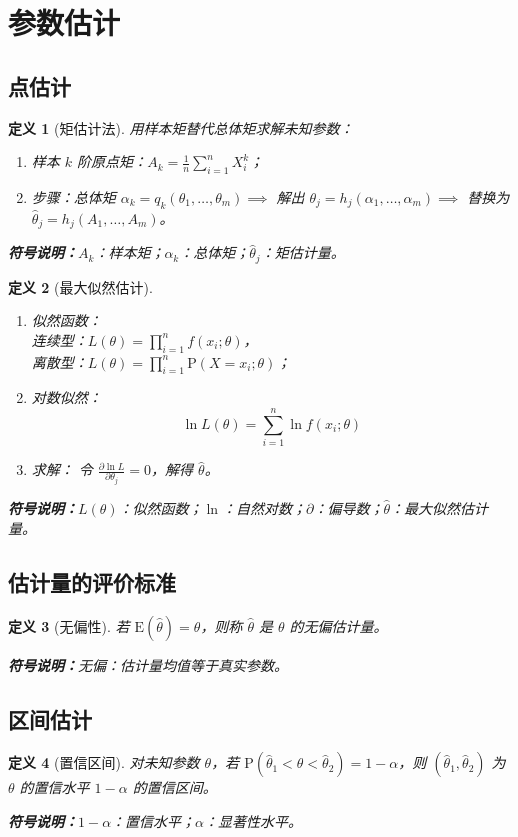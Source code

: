 \documentclass{article}
\newcommand{\E}{\mathrm{E}}
\newcommand{\Prob}{\mathrm{P}}
\newcommand{\symnote}[1]{\par\noindent\textbf{符号说明：}#1\par}
\theoremstyle{mytheorem}
\newtheorem{definition}{定义}[section]
\begin{document}
\section{参数估计}
\subsection{点估计}
\begin{definition}[矩估计法]
用样本矩替代总体矩求解未知参数：
\begin{enumerate}
    \item 样本 $k$ 阶原点矩：$A_k = \frac{1}{n} \sum_{i=1}^n X_i^k$；
    \item 步骤：总体矩 $\alpha_k = q_k(\theta_1,\dots,\theta_m) \implies$ 解出 $\theta_j = h_j(\alpha_1,\dots,\alpha_m) \implies$ 替换为 $\hat{\theta}_j = h_j(A_1,\dots,A_m)$。
\end{enumerate}
\symnote{$A_k$：样本矩；$\alpha_k$：总体矩；$\hat{\theta}_j$：矩估计量。}
\end{definition}

\begin{definition}[最大似然估计]
\begin{enumerate}
    \item 似然函数：\\
    连续型：$L(\theta) = \prod_{i=1}^n f(x_i;\theta)$，\\
    离散型：$L(\theta) = \prod_{i=1}^n \Prob(X=x_i;\theta)$；

    \item 对数似然：
    $$
    \ln L(\theta) = \sum_{i=1}^n \ln f(x_i;\theta)
    $$

    \item 求解：
    令 $\frac{\partial \ln L}{\partial \theta_j} = 0$，解得 $\hat{\theta}$。
\end{enumerate}
\symnote{$L(\theta)$：似然函数；$\ln$：自然对数；$\partial$：偏导数；$\hat{\theta}$：最大似然估计量。}
\end{definition}

\subsection{估计量的评价标准}
\begin{definition}[无偏性]
若 $\E(\hat{\theta}) = \theta$，则称 $\hat{\theta}$ 是 $\theta$ 的无偏估计量。
\symnote{无偏：估计量均值等于真实参数。}
\end{definition}

\subsection{区间估计}
\begin{definition}[置信区间]
对未知参数 $\theta$，若 $\Prob(\hat{\theta}_1<\theta<\hat{\theta}_2)=1-\alpha$，则 $(\hat{\theta}_1,\hat{\theta}_2)$ 为 $\theta$ 的置信水平 $1-\alpha$ 的置信区间。
\symnote{$1-\alpha$：置信水平；$\alpha$：显著性水平。}
\end{definition}
\end{document}
